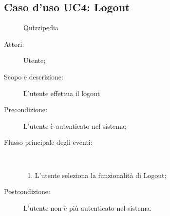 \subsection{Caso d'uso UC4: Logout}
	\begin{figure}[H]
		\centering
		\begin{resizedtikzpicture}{\textwidth}
		\begin{umlsystem}[x=0, fill=lightgray!20]{Quizzipedia}
		\end{umlsystem}
		\end{resizedtikzpicture}
		\caption{}
	\end{figure}
\begin{description}
\item[Attori:] Utente;
\item[Scopo e descrizione:] L'utente effettua il logout
      \item[Precondizione:] L'utente è autenticato nel sistema;

        \item[Flusso principale degli eventi:] \ 
 \begin{enumerate}
          \item L'utente seleziona la funzionalità di Logout;

      \end{enumerate}
    \item[Postcondizione:] L'utente non è più autenticato nel sistema.
  \end{description}
\hypertarget{UC5}{}
